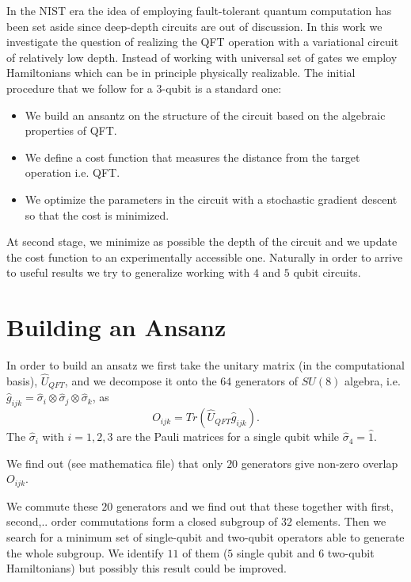 \documentclass[inscr,ack,preface]{diphdthesis}
\begin{document}
In the NIST era the idea of employing fault-tolerant quantum computation has been set aside
since deep-depth circuits are out of discussion. In this work we investigate the question
of realizing the QFT operation with a variational circuit of relatively low depth. Instead of
working with universal set of gates we employ Hamiltonians which can be in principle physically realizable.
 The initial procedure that we follow for a $3$-qubit is a standard one:
\begin{itemize}
	\item We build an ansantz on the structure of the circuit based on the algebraic properties of QFT.
	\item We define a cost function that measures the distance from the target operation i.e. QFT.
	\item We optimize the parameters in the circuit with a stochastic gradient descent so that the cost is minimized. 
\end{itemize}
At second stage, we minimize as possible the depth of the circuit and we update the cost function to an experimentally accessible one.
Naturally in order to arrive to useful results we try to generalize working with $4$ and $5$ qubit circuits.
  
\section{Building an Ansanz} 

In order to build an ansatz we first take the unitary matrix (in the computational basis), $\hat{U}_{QFT}$,
and we decompose it onto the $64$ generators of $SU(8)$ algebra, i.e. $\hat{g}_{ijk}=\hat{\sigma}_{i} \otimes \hat{\sigma}_{j} \otimes \hat{\sigma}_{k}$,
as 
\begin{equation}
O_{ijk}=Tr\left(\hat{U}_{QFT} \hat{g}_{ijk} \right).
\end{equation}
The $\hat{\sigma}_{i}$ with $i=1,2,3$ are the Pauli matrices for a single qubit while $\hat{\sigma}_{4}=\hat{1}$.

We find out (see mathematica file) that only $20$ generators give non-zero overlap $O_{ijk}$.

We commute these $20$ generators and we find out that these together with first, second,.. order commutations form
a closed subgroup of $32$ elements. Then we search for a minimum set of single-qubit and two-qubit operators able to generate the whole
subgroup. We identify $11$ of them ($5$ single qubit and $6$ two-qubit Hamiltonians) but possibly this result could be improved.
\end{document}

